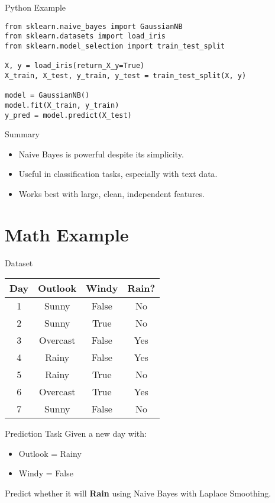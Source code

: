 \documentclass{beamer}
\begin{document}
\begin{frame}[fragile]{Python Example}
    \small
\begin{verbatim}
from sklearn.naive_bayes import GaussianNB
from sklearn.datasets import load_iris
from sklearn.model_selection import train_test_split

X, y = load_iris(return_X_y=True)
X_train, X_test, y_train, y_test = train_test_split(X, y)

model = GaussianNB()
model.fit(X_train, y_train)
y_pred = model.predict(X_test)
\end{verbatim}
\end{frame}

\begin{frame}{Summary}
  \begin{itemize}
    \item Naive Bayes is powerful despite its simplicity.
    \item Useful in classification tasks, especially with text data.
    \item Works best with large, clean, independent features.
  \end{itemize}
\end{frame}

\section{Math Example}
\begin{frame}{Dataset}
\begin{table}[]
\centering
\begin{tabular}{cccc}
\toprule
\textbf{Day} & \textbf{Outlook} & \textbf{Windy} & \textbf{Rain?} \\
\midrule
1 & Sunny    & False & No  \\
2 & Sunny    & True  & No  \\
3 & Overcast & False & Yes \\
4 & Rainy    & False & Yes \\
5 & Rainy    & True  & No  \\
6 & Overcast & True  & Yes \\
7 & Sunny    & False & No  \\
\bottomrule
\end{tabular}
\end{table}
\end{frame}

\begin{frame}{Prediction Task}
Given a new day with:
\begin{itemize}
  \item Outlook = Rainy
  \item Windy = False
\end{itemize}
Predict whether it will \textbf{Rain} using Naive Bayes with Laplace Smoothing.
\end{frame}
\end{document}
